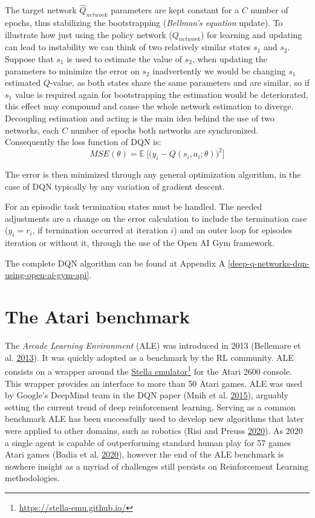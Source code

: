 \documentclass[
  12pt,
  openany]{book}
\begin{document}
The target network \(\hat{Q}_{network}\) parameters are kept constant for a \(C\) number of epochs, thus stabilizing the bootstrapping (\emph{Bellman's equation} update). To illustrate how just using the policy network (\(Q_{network}\)) for learning and updating can lead to instability we can think of two relatively similar states \(s_1\) and \(s_2\). Suppose that \(s_1\) is used to estimate the value of \(s_2\), when updating the parameters to minimize the error on \(s_2\) inadvertently we would be changing \(s_1\) estimated \(Q\)-value, as both states share the same parameters and are similar, so if \(s_1\) value is required again for bootstrapping the estimation would be deteriorated, this effect may compound and cause the whole network estimation to diverge. Decoupling estimation and acting is the main idea behind the use of two networks, each \(C\) number of epochs both networks are synchronized. Consequently the loss function of DQN is:
\[MSE(\theta) = \mathds{E}\ \Bigg[ \bigg( y_i - Q(s_i,a_i;\theta)\bigg)^2 \Bigg]\]

The error is then minimized through any general optimization algorithm, in the case of DQN typically by any variation of gradient descent.

For an episodic task termination states must be handled. The needed adjustments are a change on the error calculation to include the termination case (\(y_i = r_i\), if termination occurred at iteration \(i\)) and an outer loop for episodes iteration or without it, through the use of the Open AI Gym framework.

The complete DQN algorithm can be found at Appendix A \ref{deep-q-networks-dqn-using-open-ai-gym-api}.

\hypertarget{the-atari-benchmark}{%
\section{The Atari benchmark}\label{the-atari-benchmark}}

The \emph{Arcade Learning Environment} (ALE) was introduced in 2013 (Bellemare et al. \protect\hyperlink{ref-bellemare2013arcade}{2013}). It was quickly adopted as a benchmark by the RL community. ALE consists on a wrapper around the \href{https://stella-emu.github.io/}{Stella emulator}\footnote{\url{https://stella-emu.github.io/}} for the Atari 2600 console. This wrapper provides an interface to more than 50 Atari games. ALE was used by Google's DeepMind team in the DQN paper (Mnih et al. \protect\hyperlink{ref-mnih2015human}{2015}), arguably setting the current trend of deep reinforcement learning. Serving as a common benchmark ALE has been successfully used to develop new algorithms that later were applied to other domains, such as robotics (Risi and Preuss \protect\hyperlink{ref-risi2020chess}{2020}). As 2020 a single agent is capable of outperforming standard human play for 57 games Atari games (Badia et al. \protect\hyperlink{ref-badia2020agent57}{2020}), however the end of the ALE benchmark is nowhere insight as a myriad of challenges still persists on Reinforcement Learning methodologies.
\end{document}
